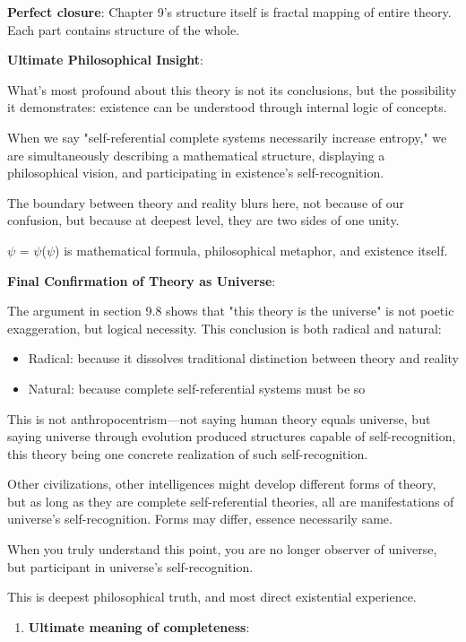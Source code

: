    \textbf{Perfect closure}: Chapter 9's structure itself
   is fractal mapping of entire theory.
   Each part contains structure of the whole.

\textbf{Ultimate Philosophical Insight}:

What's most profound about this theory is not its conclusions,
but the possibility it demonstrates:
existence can be understood through internal logic of concepts.

When we say "self-referential complete systems necessarily increase entropy,"
we are simultaneously describing a mathematical structure,
displaying a philosophical vision,
and participating in existence's self-recognition.

The boundary between theory and reality blurs here,
not because of our confusion,
but because at deepest level,
they are two sides of one unity.

$\psi$ = $\psi$($\psi$)
is mathematical formula,
philosophical metaphor,
and existence itself.

\textbf{Final Confirmation of Theory as Universe}:

The argument in section 9.8 shows that "this theory is the universe" is not poetic exaggeration,
but logical necessity. This conclusion is both radical and natural:

\begin{itemize}
\item Radical: because it dissolves traditional distinction between theory and reality
\item Natural: because complete self-referential systems must be so
\end{itemize}

This is not anthropocentrism---not saying human theory equals universe,
but saying universe through evolution produced structures capable of self-recognition,
this theory being one concrete realization of such self-recognition.

Other civilizations, other intelligences might develop different forms of theory,
but as long as they are complete self-referential theories, all are manifestations of universe's self-recognition.
Forms may differ, essence necessarily same.

When you truly understand this point,
you are no longer observer of universe,
but participant in universe's self-recognition.

This is deepest philosophical truth,
and most direct existential experience.

\begin{enumerate}
\item \textbf{Ultimate meaning of completeness}:
\end{enumerate}
   
